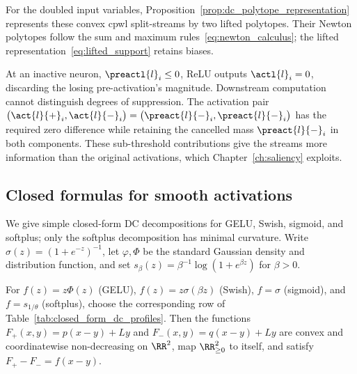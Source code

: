 For the doubled input variables, Proposition~\ref{prop:dc_polytope_representation} represents these convex \ac{cpwl} split-streams by two lifted polytopes. Their Newton polytopes follow the sum and maximum rules~\eqref{eq:newton_calculus}; the lifted representation~\eqref{eq:lifted_support} retains biases.

\begin{remark}\label{rem:subthreshold}
At an inactive neuron, $\preactl{l}_i\le0$, ReLU outputs $\actl{l}_i=0$, discarding the losing pre-activation's magnitude. Downstream computation cannot distinguish degrees of suppression. The activation pair $\bigl(\act{l}{+}_i,\act{l}{-}_i\bigr)=\bigl(\preact{l}{-}_i,\preact{l}{-}_i\bigr)$ has the required zero difference while retaining the cancelled mass $\preact{l}{-}_i$ in both components. These sub-threshold contributions give the streams more information than the original activations, which Chapter~\ref{ch:saliency} exploits.
\end{remark}

\subsection{Closed formulas for smooth activations}\label{sec:closed_form_dc_activations}

We give simple closed-form DC decompositions for GELU, Swish, sigmoid, and softplus; only the softplus decomposition has minimal curvature. Write $\sigma(z)=(1+e^{-z})^{-1}$, let $\varphi,\Phi$ be the standard Gaussian density and distribution function, and set $s_\beta(z)=\beta^{-1}\log(1+e^{\beta z})$ for $\beta>0$.

\begin{corollary}\label{cor:closed_form_dc_activations}
For $f(z)=z\Phi(z)$ (GELU), $f(z)=z\sigma(\beta z)$ (Swish), $f=\sigma$ (sigmoid), and $f=s_{1/\theta}$ (softplus), choose the corresponding row of Table~\ref{tab:closed_form_dc_profiles}. Then the functions $F_+(x,y)=p(x-y)+Ly$ and $F_-(x,y)=q(x-y)+Ly$ are convex and coordinatewise non-decreasing on $\RR^2$, map $\RR^2_{\ge0}$ to itself, and satisfy $F_+-F_-=f(x-y)$.
\end{corollary}

